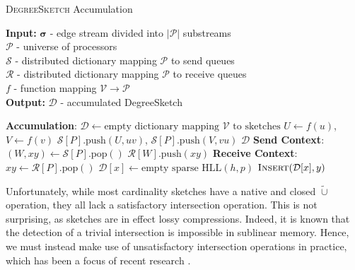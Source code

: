 \documentclass{report}
\newcommand{\push}[1]{\text{push} \left ( #1 \right )}
\newcommand{\pop}{\text{pop}()}
\newcommand{\algoname}[1]{\textnormal{\textsc{#1}}}
\begin{document}
\begin{algorithm}[htbp] 
\caption{\algoname{DegreeSketch} Accumulation}\label{alg:ds:accumulation}
\begin{flushleft}
        \textbf{Input:} 		$\boldsymbol{\sigma}$ - edge stream divided into $|\mathcal{P}|$ substreams\\
        	\hspace{2.65em}	$\mathcal{P}$ - universe of processors	 \\
        	\hspace{2.65em}	$\mathcal{S}$ - distributed dictionary mapping $\mathcal{P}$ to send queues	 \\
        	\hspace{2.65em}	$\mathcal{R}$ - distributed dictionary mapping $\mathcal{P}$ to receive queues	 \\
        	\hspace{2.65em}	$f$ - function mapping $\mathcal{V} \rightarrow \mathcal{P}$	 \\
        \textbf{Output:} $\mathcal{D}$ - accumulated DegreeSketch
\end{flushleft}
\begin{flushleft}
\begin{algorithmic}[1]
	\Statex \textbf{Accumulation}:
		\State $\mathcal{D} \gets \text{empty dictionary mapping $\mathcal{V}$ to sketches}$
  				\State $U \gets f(u)$, $V \gets f(v)$
 	 			\State $\mathcal{S}[P].\push{U, uv}$, $\mathcal{S}[P].\push{V, vu}$
			\EndWhile
		\EndParFor
		\State \Return $\mathcal{D}$
	\Statex \textbf{Send Context}:
  			\State $(W, xy) \gets \mathcal{S}[P].\pop$
			\State $\mathcal{R}[W].\push{xy}$
  		\EndWhile
	\Statex \textbf{Receive Context}:
  			\State $xy \gets \mathcal{R}[P].\pop$
				\State $\mathcal{D}[x] \gets \text{empty sparse HLL}(h, p)$
			\EndIf
	  		\State $\algoname{Insert}(\mathcal{D}[x], y)$
  		\EndWhile
\end{algorithmic}
\end{flushleft}
\end{algorithm}


Unfortunately, while most cardinality sketches have a native and closed $\widetilde{\cup}$ operation, they all lack a satisfactory intersection operation.
This is not surprising, as sketches are in effect lossy compressions. 
Indeed, it is known that the detection of a trivial intersection is impossible in sublinear memory. 
Hence, we must instead make use of unsatisfactory intersection operations in practice, which has been a focus of recent research \cite{ting2016towards, cohen2017minimal, ertl2017new}.
\end{document}
